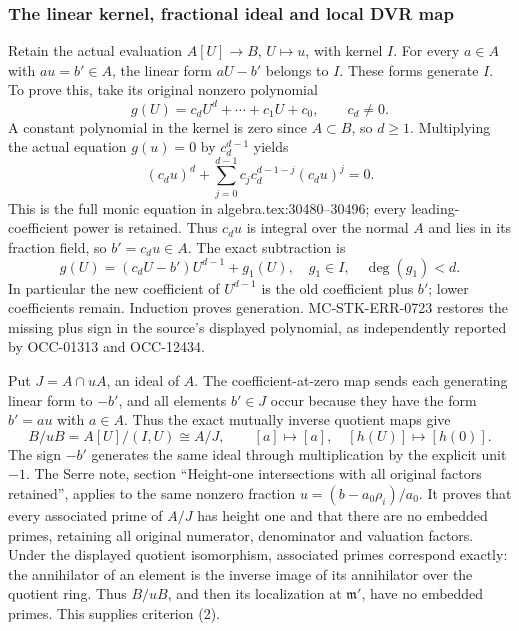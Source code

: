 \subsubsection{The linear kernel, fractional ideal and local DVR map}\label{algebra-proof-067-the-linear-kernel-fractional-ideal-and-local-dvr-map}

Retain the actual evaluation \(A[U]\to B\), \(U\mapsto u\), with kernel \(I\). For every \(a\in A\) with \(au=b'\in A\), the linear form \(aU-b'\) belongs to \(I\). These forms generate \(I\). To prove this, take its original nonzero polynomial \[
 g(U)=c_dU^d+\cdots+c_1U+c_0,\qquad c_d\ne0.
\] A constant polynomial in the kernel is zero since \(A\subset B\), so \(d\geq1\). Multiplying the actual equation \(g(u)=0\) by \(c_d^{d-1}\) yields \[
 (c_du)^d+\sum_{j=0}^{d-1}c_jc_d^{d-1-j}(c_du)^j=0.
\] This is the full monic equation in algebra.\AlgebraIdentifierBreak{}tex:\AlgebraIdentifierBreak{}30480--\AlgebraIdentifierBreak{}30496; every leading-coefficient power is retained. Thus \(c_du\) is integral over the normal \(A\) and lies in its fraction field, so \(b'=c_du\in A\). The exact subtraction is \[
 g(U)=(c_dU-b')U^{d-1}+g_1(U),
 \quad g_1\in I,\quad\deg(g_1)<d.
\] In particular the new coefficient of \(U^{d-1}\) is the old coefficient plus \(b'\); lower coefficients remain. Induction proves generation. MC-\AlgebraIdentifierBreak{}STK-\AlgebraIdentifierBreak{}ERR-\AlgebraIdentifierBreak{}0723 restores the missing plus sign in the source's displayed polynomial, as independently reported by OCC-01313 and OCC-12434.

Put \(J=A\cap uA\), an ideal of \(A\). The coefficient-at-zero map sends each generating linear form to \(-b'\), and all elements \(b'\in J\) occur because they have the form \(b'=au\) with \(a\in A\). Thus the exact mutually inverse quotient maps give \[
 B/uB=A[U]/(I,U)\cong A/J,
 \qquad [a]\longmapsto[a],\quad [h(U)]\longmapsto[h(0)].
\] The sign \(-b'\) generates the same ideal through multiplication by the explicit unit \(-1\). The Serre note, section ``Height-one intersections with all original factors retained'', applies to the same nonzero fraction \(u=(b-a_0\rho_i)/a_0\). It proves that every associated prime of \(A/J\) has height one and that there are no embedded primes, retaining all original numerator, denominator and valuation factors. Under the displayed quotient isomorphism, associated primes correspond exactly: the annihilator of an element is the inverse image of its annihilator over the quotient ring. Thus \(B/uB\), and then its localization at \(\mathfrak m'\), have no embedded primes. This supplies criterion (2).


